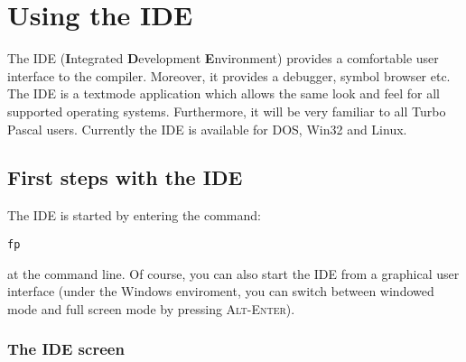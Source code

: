 %
%
%
%
%
\chapter{Using the IDE}

The IDE (\textbf{I}ntegrated \textbf{D}evelopment \textbf{E}nvironment)
provides a comfortable user interface to the compiler. Moreover, it
provides a debugger, symbol browser etc. The IDE is a textmode
application which allows the same look and feel for all supported
operating systems. Furthermore, it will be very familiar to all
Turbo Pascal users.
Currently the IDE is available for DOS, Win32 and Linux.

\section{First steps with the IDE}

The IDE is started by entering the command:
\begin{verbatim}
fp
\end{verbatim}
at the command line. Of course, you can also start the IDE
from a graphical user interface (under the Windows enviroment, you
can switch between windowed mode and full screen mode by pressing
\textsc{Alt-Enter}).

\subsection{The IDE screen}

